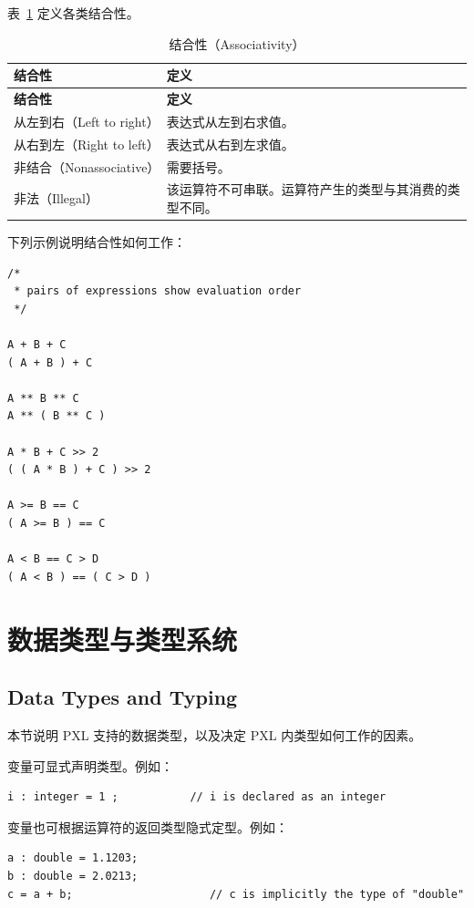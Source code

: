 表~\ref{tab:pxl-associativity} 定义各类结合性。

\begin{longtable}{@{}p{} p{}@{}}
\caption{结合性（Associativity）}\label{tab:pxl-associativity}\\
\toprule
\textbf{结合性} & \textbf{定义} \\
\midrule
\endfirsthead
\toprule
\textbf{结合性} & \textbf{定义} \\
\midrule
\endhead
\bottomrule
\endfoot
从左到右（Left to right） & 表达式从左到右求值。 \\
从右到左（Right to left） & 表达式从右到左求值。 \\
非结合（Nonassociative） & 需要括号。 \\
非法（Illegal） & 该运算符不可串联。运算符产生的类型与其消费的类型不同。 \\
\end{longtable}

下列示例说明结合性如何工作：
\begin{lstlisting}[style=pxl]
/*
 * pairs of expressions show evaluation order
 */

A + B + C
( A + B ) + C

A ** B ** C
A ** ( B ** C )

A * B + C >> 2
( ( A * B ) + C ) >> 2

A >= B == C
( A >= B ) == C

A < B == C > D
( A < B ) == ( C > D )
\end{lstlisting}

\section{数据类型与类型系统}
\subsection*{Data Types and Typing}

本节说明 PXL 支持的数据类型，以及决定 PXL 内类型如何工作的因素。

变量可显式声明类型。例如：
\begin{lstlisting}[style=pxl]
i : integer = 1 ;           // i is declared as an integer
\end{lstlisting}

变量也可根据运算符的返回类型隐式定型。例如：
\begin{lstlisting}[style=pxl]
a : double = 1.1203;
b : double = 2.0213;
c = a + b;                     // c is implicitly the type of "double"
\end{lstlisting}

